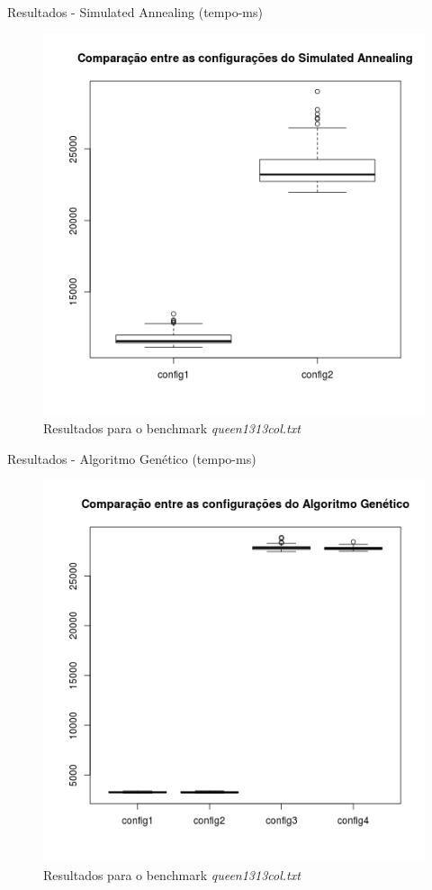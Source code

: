 \documentclass[compress, hide notes]{beamer}
\begin{document}
        \begin{frame}{Resultados - Simulated Annealing (tempo-ms)}
        
        	\begin{figure}[H]
			\centering
            \label{fig:tmp-sa-queen1313col}
            \includegraphics[width=0.6\linewidth]{img/sa-tmp-queen1313col.png}
            \caption[Resultados para o benchmark queen1313col.txt]{Resultados para o benchmark \textit{queen1313col.txt}}
			\end{figure}

		\end{frame}
        
        \begin{frame}{Resultados - Algoritmo Genético (tempo-ms)}
        
        	\begin{figure}[H]
			\centering
            \label{fig:tmp-ga-queen1313col}
            \includegraphics[width=0.6\linewidth]{img/ga-tmp-queen1313col.png}
            \caption[Resultados para o benchmark queen1313col.txt]{Resultados para o benchmark \textit{queen1313col.txt}}
			\end{figure}

		\end{frame}
	
\end{document}
